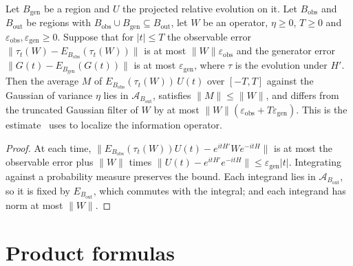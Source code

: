 \begin{theorem}
    \label{thm:dynamics_supported_gaussian}
    \leanok
    Let $B_{\mathrm{gen}}$ be a region and $U$ the projected relative evolution on
    it. Let $B_{\mathrm{obs}}$ and $B_{\mathrm{out}}$ be regions with
    $B_{\mathrm{obs}}\cup B_{\mathrm{gen}}\subseteq B_{\mathrm{out}}$, let $W$ be an
    operator, $\eta\geq0$, $T\geq0$ and $\varepsilon_{\mathrm{obs}},
    \varepsilon_{\mathrm{gen}}\geq0$. Suppose that for $|t|\leq T$ the observable
    error $\lVert\tau_t(W)-E_{B_{\mathrm{obs}}}(\tau_t(W))\rVert$ is at most
    $\lVert W\rVert\varepsilon_{\mathrm{obs}}$ and the generator error
    $\lVert G(t)-E_{B_{\mathrm{gen}}}(G(t))\rVert$ is at most
    $\varepsilon_{\mathrm{gen}}$, where $\tau$ is the evolution under $H'$. Then
    the average $M$ of $E_{B_{\mathrm{obs}}}(\tau_t(W))\,U(t)$ over $[-T,T]$
    against the Gaussian of variance $\eta$ lies in $\mathcal A_{B_{\mathrm{out}}}$,
    satisfies $\lVert M\rVert\leq\lVert W\rVert$, and differs from the truncated
    Gaussian filter of $W$ by at most
    $\lVert W\rVert(\varepsilon_{\mathrm{obs}}+T\varepsilon_{\mathrm{gen}})$. This
    is the estimate~\cite[Section~2]{OpenAI2026PolynomialPEPS} uses to localize the
    information operator.
\end{theorem}
\begin{proof}\leanok
    At each time,
    $\lVert E_{B_{\mathrm{obs}}}(\tau_t(W))U(t)-e^{itH'}We^{-itH}\rVert$ is at
    most the observable error plus $\lVert W\rVert$ times
    $\lVert U(t)-e^{itH'}e^{-itH}\rVert\leq\varepsilon_{\mathrm{gen}}|t|$.
    Integrating against a probability measure preserves the bound. Each integrand
    lies in $\mathcal A_{B_{\mathrm{out}}}$, so it is fixed by
    $E_{B_{\mathrm{out}}}$, which commutes with the integral; and each integrand
    has norm at most $\lVert W\rVert$.
\end{proof}

\section{Product formulas}
\label{sec:dynamics_product_formulas}

